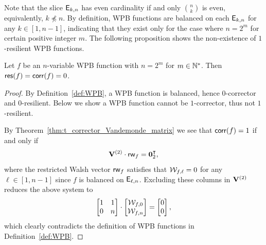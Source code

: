 \documentclass[11pt]{llncs}
\begin{document}
Note that the slice $\mathsf{E}_{k,n}$ has even cardinality if and only ${n\choose k}$ is even, equivalently, $k \not\preceq n$.
By definition, WPB functions are balanced on each $\mathsf{E}_{k,n}$ for any $k\in [1,n-1]$, indicating that they exist only for the case where $n=2^m$ for certain positive integer $m$.
The following proposition shows the non-existence of $1$-resilient WPB functions.
\begin{proposition}\label{thm:WPB}
	Let $f$ be an $n$-variable WPB function with $n=2^m$ for $m\in \mathbb{N}^{*}$.
	Then  $\mathsf{res}(f) = \mathsf{corr}(f) = 0$.
\end{proposition}
\begin{proof}
	By Definition~\ref{def:WPB}, a WPB function is balanced, hence $0$-corrector and $0$-resilient.
	Below we show a WPB function cannot be $1$-corrector, thus not $1$-resilient.

	By Theorem~\ref{thm:t_corrector_Vandemonde_matrix} we see that $\mathsf{corr}(f) = 1$ if and only if
	\[
	\mathbf{V}^{(2)}\cdot \mathsf{rw}_{f} = \mathbf{0}_2^{\intercal},
	\] where the restricted Walsh vector $\mathsf{rw}_{f}$ satisfies that $\mathcal{W}_{f,\ell} = 0$ for any $\ell \in [1,n-1]$ since $f$ is balanced on $\mathsf{E}_{\ell,n}$.
	Excluding these columns in $\mathbf{V}^{(2)}$ reduces the above system to
	\[
	\begin{bmatrix}
	1 & 1 \\ 0 & n
	\end{bmatrix}
	\cdot \begin{bmatrix}
	\mathcal{W}_{f,0} \\ \mathcal{W}_{f,n}
	\end{bmatrix} =
	\begin{bmatrix}
	0 \\ 0
	\end{bmatrix},
	\]
	which clearly contradicts the definition of WPB functions in Definition~\ref{def:WPB}.
\end{proof}
\end{document}
